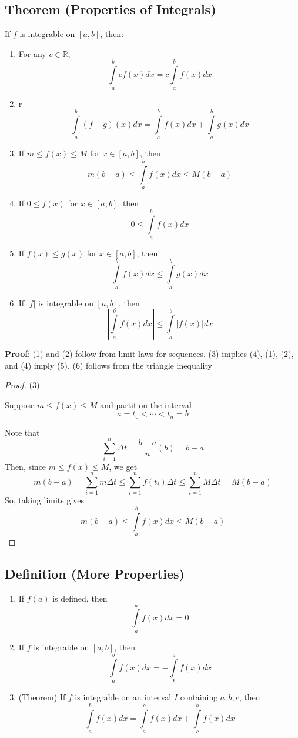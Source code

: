 \subsection{Theorem (Properties of Integrals)}
If $ f $ is integrable on $ [a,b] $, then:
\begin{enumerate}[label=(\arabic*)]
    \item For any $ c\in\mathbb{R} $,
          \[ \int\limits_{a}^{b} cf(x) d{x} = c \int\limits_{a}^{b} f(x) d{x} \]
    \item r
          \[ \int\limits_{a}^{b} (f+g)(x) d{x} = \int\limits_{a}^{b} f(x) d{x} +
              \int\limits_{a}^{b} g(x) d{x} \]
    \item If $ m\le f(x)\le M $ for $ x\in[a,b] $, then
          \[ m(b-a)\le \int\limits_{a}^{b} f(x) d{x} \le M(b-a) \]
    \item If $ 0\le f(x) $ for $ x\in[a,b] $, then
          \[ 0\le \int\limits_{a}^{b} f(x) d{x} \]
    \item If $ f(x)\le g(x) $ for $ x\in[a,b] $, then
          \[ \int\limits_{a}^{b} f(x) d{x} \le \int\limits_{a}^{b} g(x) d{x} \]
    \item If $ |f| $ is integrable on $ [a,b] $, then
          \[ \left|\int\limits_{a}^{b} f(x) d{x}\right|\le \int\limits_{a}^{b} |f(x)| d{x} \]
\end{enumerate}

\textbf{Proof}: (1) and (2) follow from limit laws for sequences. (3) implies (4),
(1), (2), and (4) imply (5). (6) follows from the triangle inequality

\begin{proof} (3)

    Suppose $ m\le f(x)\le M $ and partition the interval
    \[ a=t_0<\cdots<t_n=b \]

    Note that
    \[ \sum\limits_{i=1}^{n} \Delta t=\frac{b-a}{n}(b)=b-a \]
    Then, since $ m\le f(x)\le M $, we get
    \[ m(b-a)=\sum\limits_{i=1}^{n} m\Delta t\le \sum\limits_{i=1}^{n} f(t_i)\Delta t
        \le \sum\limits_{i=1}^{n} M\Delta t=M(b-a) \]
    So, taking limits gives
    \[ m(b-a)\le \int\limits_{a}^{b} f(x) d{x} \le M(b-a) \]
\end{proof}

\subsection{Definition (More Properties)}
\begin{enumerate}[label=(\arabic*)]
    \item If $ f(a) $ is defined, then
          \[ \int\limits_{a}^{a} f(x) d{x} =0 \]
    \item If $ f $ is integrable on $ [a,b] $, then
          \[ \int\limits_{a}^{b} f(x) d{x}=-\int\limits_{b}^{a} f(x) d{x} \]
    \item (Theorem) If $ f $ is integrable on an interval $ I $ containing $ a,b,c $, then
          \[ \int\limits_{a}^{b} f(x) d{x}=\int\limits_{a}^{c} f(x) d{x}+\int\limits_{c}^{b} f(x) d{x} \]
\end{enumerate}

